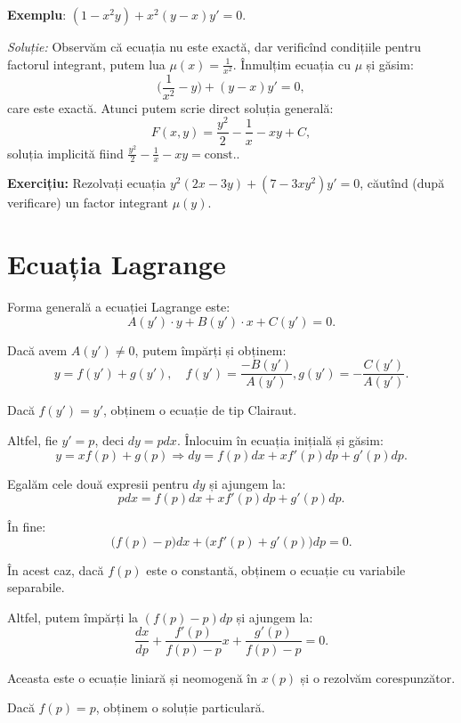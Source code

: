 \documentclass[11pt,a4paper]{article}
\theoremstyle{dotless}
\theoremstyle{dotlessdr}
\begin{document}
\textbf{Exemplu}: $(1 - x^2 y) + x^2 (y - x) y' = 0$.

\emph{Soluție:} Observăm că ecuația nu este exactă, dar verificînd condițiile pentru factorul
integrant, putem lua $\mu(x) = \frac{1}{x^2}$. Înmulțim ecuația cu $\mu$ și găsim:
\[
  \Big( \frac{1}{x^2} - y \Big) + (y - x)y' = 0,
\]
care este exactă. Atunci putem scrie direct soluția generală:
\[
  F(x, y) = \frac{y^2}{2} - \frac{1}{x} - xy + C,
\]
soluția implicită fiind $\frac{y^2}{2} - \frac{1}{x} - xy = \text{const.}$.

\vspace{1cm}

\textbf{Exercițiu:} Rezolvați ecuația $y^2 (2x - 3y) + (7 - 3xy^2) y' = 0$, căutînd
(după verificare) un factor integrant $\mu(y)$.


\section{Ecuația Lagrange}
\label{sec:lagr}

Forma generală a ecuației Lagrange este:
\[
  A(y')\cdot y + B(y')\cdot x + C(y') = 0.
\]

Dacă avem $A(y') \neq 0$, putem împărți și obținem:
\[
  y = f(y') + g(y'), \quad f(y') = \frac{- B(y')}{A(y')}, g(y') = -\frac{C(y')}{A(y')}.
\]

Dacă $f(y') = y'$, obținem o ecuație de tip Clairaut.

Altfel, fie $y' = p$, deci $dy = pdx$. Înlocuim în ecuația inițială și găsim:
\[
  y = xf(p) + g(p) \Rightarrow dy = f(p) dx + xf'(p) dp + g'(p) dp.
\]

Egalăm cele două expresii pentru $dy$ și ajungem la:
\[
  pdx = f(p) dx + xf'(p) dp + g'(p) dp.
\]

În fine:
\[
  \big( f(p) - p \big) dx + \big( xf'(p) + g'(p) \big) dp = 0.
\]

În acest caz, dacă $f(p)$ este o constantă, obținem o ecuație cu variabile separabile.

Altfel, putem împărți la $(f(p) - p) dp$ și ajungem la:
\[
  \frac{dx}{dp} + \frac{f'(p)}{f(p) - p} x + \frac{g'(p)}{f(p) - p} = 0.
\]

Aceasta este o ecuație liniară și neomogenă în $x(p)$ și o rezolvăm corespunzător.

Dacă $f(p) = p$, obținem o soluție particulară.

\vspace{1cm}
\end{document}
